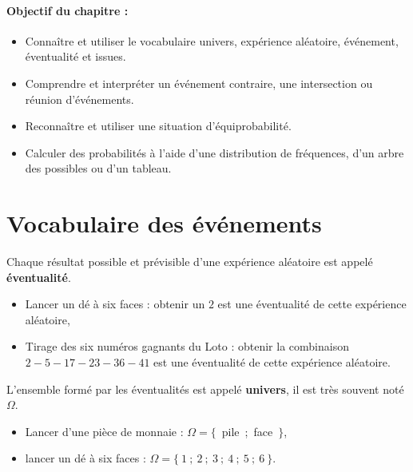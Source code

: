 \paragraph*{Objectif du chapitre :}
\begin{itemize}
\item  Connaître et utiliser le vocabulaire univers, expérience aléatoire, événement, éventualité et issues.
\item  Comprendre et interpréter un événement contraire, une intersection ou réunion d'événements.
\item  Reconnaître et utiliser une situation d'équiprobabilité.
\item  Calculer des probabilités à l'aide d'une distribution de fréquences, d'un arbre des possibles ou d'un tableau.
\end{itemize}

\section{Vocabulaire des événements} 

\begin{defi}{}{}
   Chaque résultat possible et prévisible d'une expérience aléatoire est appelé \textbf{éventualité}.
\end{defi}

\begin{ex}{}{}
   \begin{itemize}
      \item  Lancer un dé à six faces : \og obtenir un $2$ \fg{} est une éventualité de cette expérience aléatoire,
      \item  Tirage des six numéros gagnants du Loto : \og obtenir la combinaison \og{} $2-5-17-23-36-41$ \fg{} est une éventualité de cette expérience aléatoire.
   \end{itemize}
\end{ex}

\begin{defi}{}{}
   L'ensemble formé par les éventualités est appelé \textbf{univers}, il est très souvent noté $\Omega$.
\end{defi}

\begin{ex}{}{}
   \begin{itemize}
      \item  Lancer d'une pièce de monnaie : $\Omega =\{$~pile~;~face~$\}$,
      \item  lancer un dé à six faces : $\Omega =\{~1~;~2~;~3~;~4~;~5~;~6~\}$.
   \end{itemize}
\end{ex}

